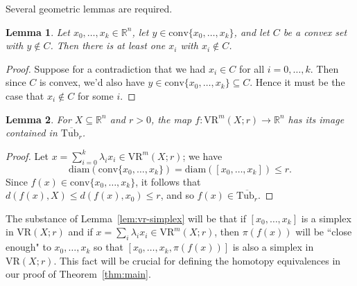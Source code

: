 \documentclass{amsart}
\theoremstyle{plain}
\newtheorem{lemma}{Lemma}[section]
\theoremstyle{definition}
\theoremstyle{myremark}
\newcommand{\R}{\mathbb{R}}
\newcommand{\diam}{\mathrm{diam}}
\newcommand{\conv}{\mathrm{conv}}
\newcommand{\vr}[2]{\mathrm{VR}(#1;#2)}
\newcommand{\vrm}[2]{\mathrm{VR}^m(#1;#2)}
\newcommand{\Tub}{\mathrm{Tub}}
\begin{document}
Several geometric lemmas are required.

\begin{lemma}\label{lem:convex}
Let $x_0,\ldots,x_k\in\R^n$, let $y\in\conv\{x_0,\ldots,x_k\}$, and let $C$ be a convex set with $y\notin C$. Then there is at least one $x_i$ with $x_i\notin C$.
\end{lemma}

\begin{proof}
Suppose for a contradiction that we had $x_i\in C$ for all $i=0,\ldots,k$. Then since $C$ is convex, we'd also have $y\in \conv\{x_0,\ldots,x_k\}\subseteq C$. Hence it must be the case that $x_i\notin C$ for some $i$.
\end{proof}

\begin{lemma}\label{lem:vr-tub}
For $X\subseteq\R^n$ and $r>0$, the map $f\colon \vrm{X}{r}\to\R^n$ has its image contained in $\overline{\Tub_r}$.
\end{lemma}

\begin{proof}
Let $x = \sum_{i=0}^k \lambda_i x_i\in \vrm{X}{r}$; we have
\[ \diam(\conv\{x_0,\ldots,x_k\})=\diam([x_0 , \ldots , x_k])\le r.\]
Since $f(x)\in\conv\{x_0,\ldots,x_k\}$, it follows that $d(f(x),X)\le d(f(x),x_0)\le r$, and so $f(x)\in\overline{\Tub_r}$.
\end{proof}

The substance of Lemma~\ref{lem:vr-simplex} will be that if $[x_0,\ldots,x_k]$ is a simplex in $\vr{X}{r}$ and if $x=\sum_i\lambda_i x_i\in \vrm{X}{r}$, then $\pi(f(x))$ will be ``close enough" to $x_0,\ldots,x_k$ so that $[x_0,\ldots,x_k,\pi(f(x))]$ is also a simplex in $\vr{X}{r}$.
This fact will be crucial for defining the homotopy equivalences in our proof of Theorem~\ref{thm:main}.
\end{document}
